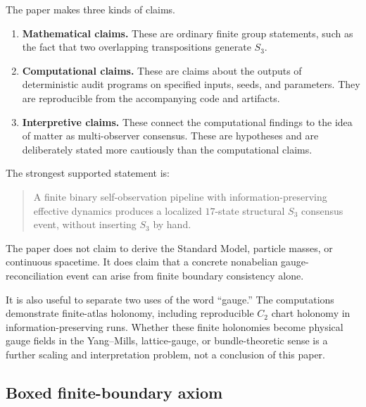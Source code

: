 \documentclass[11pt]{article}
\begin{document}
The paper makes three kinds of claims.

\begin{enumerate}[label=(\roman*)]
\item \textbf{Mathematical claims.}  These are ordinary finite group statements, such as the fact that two overlapping transpositions generate $S_3$.
\item \textbf{Computational claims.}  These are claims about the outputs of deterministic audit programs on specified inputs, seeds, and parameters.  They are reproducible from the accompanying code and artifacts.
\item \textbf{Interpretive claims.}  These connect the computational findings to the idea of matter as multi-observer consensus.  These are hypotheses and are deliberately stated more cautiously than the computational claims.
\end{enumerate}

The strongest supported statement is:
\begin{quote}
A finite binary self-observation pipeline with information-preserving effective dynamics produces a localized $17$-state structural $S_3$ consensus event, without inserting $S_3$ by hand.
\end{quote}

The paper does not claim to derive the Standard Model, particle masses, or continuous spacetime.  It does claim that a concrete nonabelian gauge-reconciliation event can arise from finite boundary consistency alone.

It is also useful to separate two uses of the word ``gauge.''  The computations demonstrate finite-atlas holonomy, including reproducible $C_2$ chart holonomy in information-preserving runs.  Whether these finite holonomies become physical gauge fields in the Yang--Mills, lattice-gauge, or bundle-theoretic sense is a further scaling and interpretation problem, not a conclusion of this paper.


\subsection*{Boxed finite-boundary axiom}
\end{document}
